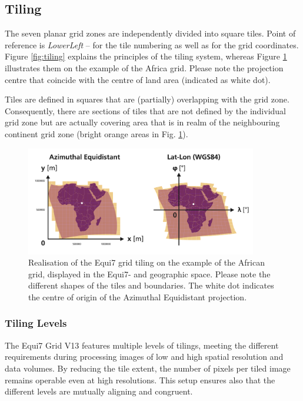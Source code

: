 \documentclass[10pt,a4paper]{article}
\begin{document}
\newpage

\subsection{Tiling}

The seven planar grid zones are independently divided into square tiles. Point of reference is \textit{LowerLeft} -- for the tile numbering as well as for the grid coordinates. Figure \ref{fig:tiling} explains the principles of the tiling system, whereas Figure \ref{fig:tiling_africa} illustrates them on the example of the Africa grid. Please note the projection centre that coincide with the centre of land area (indicated as white dot). 

Tiles are defined in squares that are (partially) overlapping with the grid zone. Consequently, there are sections of tiles that are not defined by the individual grid zone but are actually covering area that is in realm of the neighbouring continent grid zone (bright orange areas in Fig. \ref{fig:tiling_africa}).

\begin{figure}[hbtp]
\centering
\includegraphics[width=0.9\textwidth]{equi7_tiling_africa}
\caption{
Realisation of the Equi7 grid tiling on the example of the African grid, displayed in the Equi7- and geographic space. Please note the different shapes of the tiles and boundaries. The white dot indicates the centre of origin of the Azimuthal Equidistant projection.
}
\label{fig:tiling_africa}
\end{figure}

\subsubsection*{Tiling Levels}

The Equi7 Grid V13 features multiple levels of tilings, meeting the different requirements during processing images of low and high spatial resolution and data volumes. By reducing the tile extent, the number of pixels per tiled image remains operable even at high resolutions. This setup ensures also that the different levels are mutually aligning and congruent. 
\end{document}
